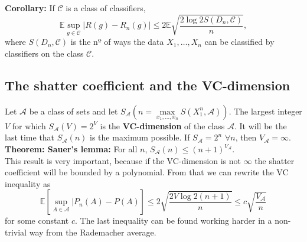 \documentclass[11pt, english]{article}
\begin{document}
 \textbf{Corollary:} If $\mathcal{C}$ is a class of classifiers, \begin{equation}
 	\mathbb{E}\underset{g\in\mathcal{C}}{\sup}|R(g)-R_n(g)|\leq 2\mathbb{E}\sqrt{\frac{2\log 2S(D_n,\mathcal{C})}{n}},
 \end{equation} where $S(D_n,\mathcal{C})$ is the nº of ways the data $X_1,\dots,X_n$ can be classified by classifiers on the class $\mathcal{C}$.\\
 
\subsection*{The shatter coefficient and the VC-dimension}
Let $\mathcal{A}$ be a class of sets and let $S_{\mathcal{A}}(n=\underset{x_1,\dots,x_n}{\max}S(X_1^n,\mathcal{A}))$. The largest integer $V$ for which $S_{\mathcal{A}}(V)=2^V$ is the \textbf{VC-dimension} of the class $\mathcal{A}$. It will be the last time that $S_{\mathcal{A}}(n)$ is the maximum possible. If $S_{\mathcal{A}}=2^n$ $\forall n$, then $V_{\mathcal{A}}=\infty$.\\%
 
\textbf{Theorem: Sauer's lemma:} For all $n$, $S_{\mathcal{A}}(n)\leq (n+1)^{V_{\mathcal{A}}}$.\\
 
This result is very important, because if the VC-dimension is not $\infty$ the shatter coefficient will be bounded by a polynomial. From that we can rewrite the VC inequality as 
\begin{equation}
 	\mathbb{E}[\underset{A\in\mathcal{A}}{\sup}|P_n(A)-P(A)]\leq 2\sqrt{\frac{2V\log 2(n+1)}{n}}\leq c\sqrt{\frac{V_{\mathcal{A}}}{n}}
\end{equation}
for some constant $c$. The last inequality can be found working harder in a non-trivial way from the Rademacher average.\\
\end{document}
